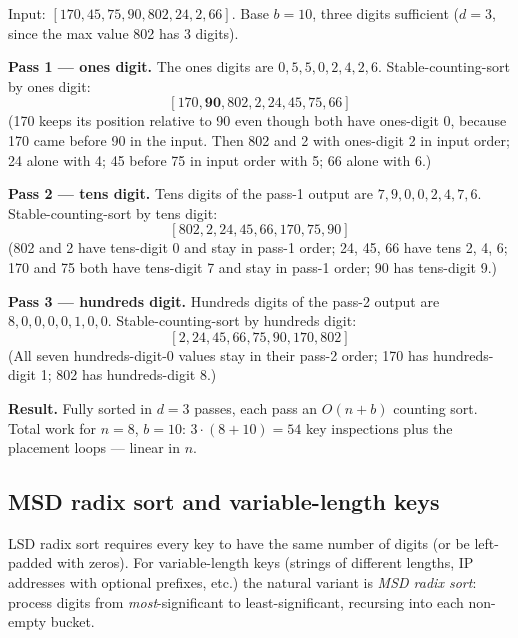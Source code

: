 \documentclass[11pt]{article}
\begin{document}
\begin{examplebox}
Input: $[170, 45, 75, 90, 802, 24, 2, 66]$. Base $b = 10$, three
digits sufficient ($d = 3$, since the max value 802 has 3 digits).

\textbf{Pass 1 --- ones digit.} The ones digits are
$0, 5, 5, 0, 2, 4, 2, 6$. Stable-counting-sort by ones digit:
\[
[170, \mathbf{90}, 802, 2, 24, 45, 75, 66]
\]
(170 keeps its position relative to 90 even though both have
ones-digit 0, because 170 came before 90 in the input. Then 802
and 2 with ones-digit 2 in input order; 24 alone with 4; 45
before 75 in input order with 5; 66 alone with 6.)

\textbf{Pass 2 --- tens digit.} Tens digits of the pass-1 output
are $7, 9, 0, 0, 2, 4, 7, 6$. Stable-counting-sort by tens digit:
\[
[802, 2, 24, 45, 66, 170, 75, 90]
\]
(802 and 2 have tens-digit 0 and stay in pass-1 order; 24, 45, 66
have tens 2, 4, 6; 170 and 75 both have tens-digit 7 and stay in
pass-1 order; 90 has tens-digit 9.)

\textbf{Pass 3 --- hundreds digit.} Hundreds digits of the
pass-2 output are $8, 0, 0, 0, 0, 1, 0, 0$. Stable-counting-sort
by hundreds digit:
\[
[2, 24, 45, 66, 75, 90, 170, 802]
\]
(All seven hundreds-digit-0 values stay in their pass-2 order;
170 has hundreds-digit 1; 802 has hundreds-digit 8.)

\textbf{Result.} Fully sorted in $d = 3$ passes, each pass an
$O(n + b)$ counting sort. Total work for $n = 8$, $b = 10$:
$3 \cdot (8 + 10) = 54$ key inspections plus the placement loops
--- linear in $n$.
\end{examplebox}

\subsection*{MSD radix sort and variable-length keys}

LSD radix sort requires every key to have the same number of
digits (or be left-padded with zeros). For variable-length keys
(strings of different lengths, IP addresses with optional
prefixes, etc.) the natural variant is \emph{MSD radix sort}:
process digits from \emph{most}-significant to least-significant,
recursing into each non-empty bucket.
\end{document}
